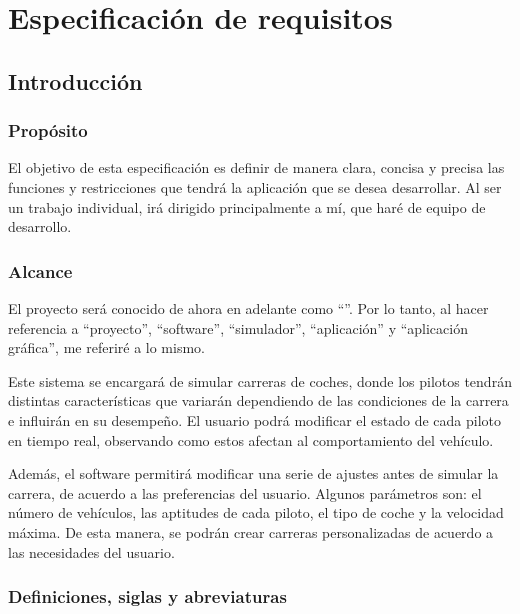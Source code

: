 \chapter{Especificación de requisitos}

\section{Introducción}

\subsection{Propósito}
El objetivo de esta especificación es definir de manera clara, concisa y precisa las funciones y restricciones que tendrá la aplicación que se desea desarrollar. Al ser un trabajo individual, irá dirigido principalmente a mí, que haré de equipo de desarrollo.

\subsection{Alcance}
El proyecto será conocido de ahora en adelante como ``\myTitle''. Por lo tanto, al hacer referencia a ``proyecto'', ``software'', ``simulador'', ``aplicación'' y ``aplicación gráfica'', me referiré a lo mismo.

\bigskip

Este sistema se encargará de simular carreras de coches, donde los pilotos tendrán distintas características que variarán dependiendo de las condiciones de la carrera e influirán en su desempeño. El usuario podrá modificar el estado de cada piloto en tiempo real, observando como estos afectan al comportamiento del vehículo.

\bigskip

Además, el software permitirá modificar una serie de ajustes antes de simular la carrera, de acuerdo a las preferencias del usuario. Algunos parámetros son: el número de vehículos, las aptitudes de cada piloto, el tipo de coche y la velocidad máxima. De esta manera, se podrán crear carreras personalizadas de acuerdo a las necesidades del usuario.

\newpage

\subsection{Definiciones, siglas y abreviaturas}

